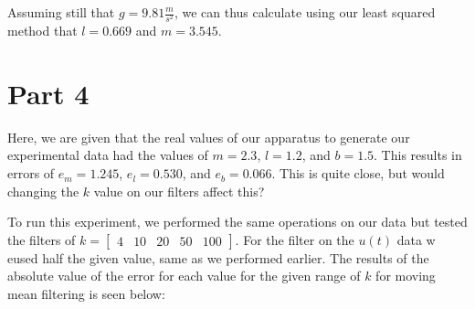 \documentclass{article}
\begin{document}
Assuming still that $g=9.81 \frac{m}{s^2}$, we can thus calculate using our least squared method that $l=0.669$ and $m=3.545$.

\section*{Part 4}

Here, we are given that the real values of our apparatus to generate our experimental data had the values of $m=2.3$, $l=1.2$, and $b=1.5$. This results in errors of $e_m = 1.245$, $e_l= 0.530$, and $e_b = 0.066$. This is quite close, but would changing the $k$ value on our filters affect this?

To run this experiment, we performed the same operations on our data but tested the filters of $k= \begin{bmatrix}
    4 & 10 & 20 & 50 & 100
\end{bmatrix}$. For the filter on the $u(t)$ data w eused half the given value, same as we performed earlier. The results of the absolute value of the error for each value for the given range of $k$ for moving mean filtering is seen below:
\end{document}

